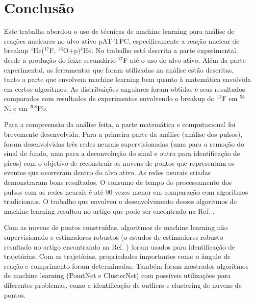 \documentclass[a4paper,12pt,oneside]{book}
\begin{document}
%
%

\chapter{Conclusão}\label{chapter:conclusao}

\par Este trabalho abordou o uso de técnicas de machine learning para análise de reações nucleares no alvo ativo pAT-TPC, especificamente a reação nuclear de breakup  $^4$He($^{17}$F, $^{16}$O+p)$^4$He. No trabalho está descrita a parte experimental, desde a produção do feixe secundário $^{17}$F até o uso do alvo ativo. Além da parte experimental, as ferramentas que foram utilizadas na análise estão descritas, tanto a parte que envolvem machine learning bem quanto à matemática envolvida em certos algoritmos. As distribuições angulares foram obtidas e seus resultados comparados com resultados de experimentos envolvendo o breakup do $^{17}$F em $^{58}$Ni e em $^{208}$Pb.

\par Para a compreensão da análise feita, a parte matemática e computacional foi brevemente desenvolvida. Para a primeira parte da análise (análise dos pulsos), foram desenvolvidas três redes neurais supervisionadas (uma para a remoção do sinal de fundo, uma para a deconvolução do sinal e outra para identificação de picos) com o objetivo de reconstruir as nuvens de pontos que representam os eventos que ocorreram dentro do alvo ativo. As redes neurais criadas demonstraram bons resultados. O consumo de tempo do processamento dos pulsos com as redes neurais é até 90 vezes menor em comparação com algoritmos tradicionais. O trabalho que envolveu o desenvolvimento desses algoritmos de machine learning resultou no artigo que pode ser encontrado na Ref. \cite{FORTINO2022166497}.

\par Com as nuvens de pontos construídas, algoritmos de machine learning não supervisionado e estimadores robustos (o estudos de estimadores robusto resultado no artigo encontrando na Ref. \cite{artigo}) foram usados para identificação de trajetórias. Com as trajetórias, propriedades importantes como o ângulo de reação e comprimento foram determinadas. Também foram mostrados algoritmos de machine learning (PointNet e ClusterNet) com possíveis utilizações para diferentes problemas, como a identificação de outliers e clustering de nuvens de pontos.
\end{document}
